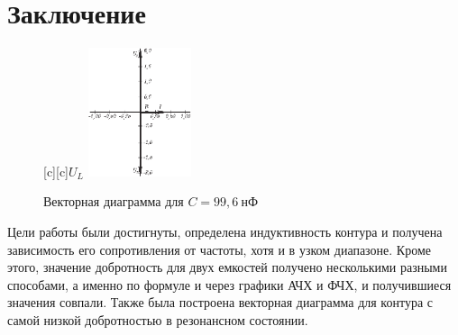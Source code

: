 \documentclass[12pt,a4paper]{article}
\begin{document}
\section{Заключение}
\begin{figure}
[c][c]{$U_L$}
\centering\includegraphics[width = 0.27\textwidth]{Pct5.eps}
\captionsetup{justification = centering}
\caption{Векторная диаграмма для $C = 99,6~\text{нФ}$\label{Fig8}}
\end{figure}
Цели работы были достигнуты, определена индуктивность контура и получена зависимость его сопротивления от частоты, хотя и в узком диапазоне. Кроме этого, значение добротность для двух емкостей получено несколькими разными способами, а именно по формуле и через графики АЧХ и ФЧХ, и получившиеся значения совпали. Также была построена векторная диаграмма для контура с самой низкой добротностью в резонансном состоянии.
\end{document}
